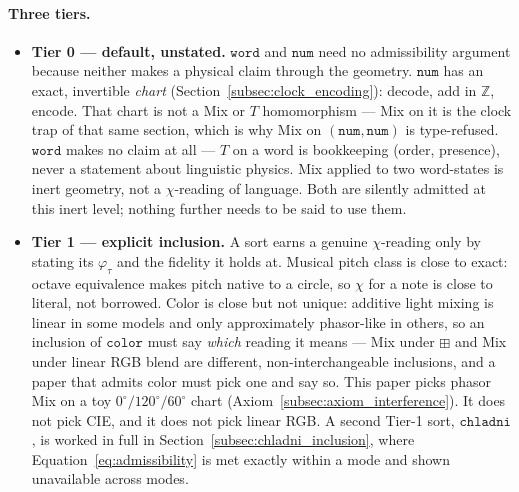 \documentclass[12pt, a4paper]{article}
\begin{document}
\paragraph{Three tiers.}
\begin{itemize}
    \item \textbf{Tier 0 --- default, unstated.} $\mathtt{word}$ and
    $\mathtt{num}$ need no admissibility argument because neither
    makes a physical claim through the geometry. $\mathtt{num}$
    has an exact, invertible \emph{chart}
    (Section~\ref{subsec:clock_encoding}): decode, add in
    $\mathbb{Z}$, encode. That chart is not a Mix or $T$
    homomorphism --- Mix on it is the clock trap of that same
    section, which is why Mix on $(\mathtt{num},\mathtt{num})$ is
    type-refused. $\mathtt{word}$ makes no claim at all --- $T$ on a
    word is bookkeeping (order, presence), never a statement about
    linguistic physics. Mix applied to two word-states is inert
    geometry, not a $\chi$-reading of language. Both are silently
    admitted at this inert level; nothing further needs to be said
    to use them.

    \item \textbf{Tier 1 --- explicit inclusion.} A sort earns a
    genuine $\chi$-reading only by stating its $\varphi_\tau$ and the
    fidelity it holds at. Musical pitch class is close to exact:
    octave equivalence makes pitch native to a circle, so $\chi$ for
    a note is close to literal, not borrowed. Color is close but not
    unique: additive light mixing is linear in some models and only
    approximately phasor-like in others, so an inclusion of
    $\mathtt{color}$ must say \emph{which} reading it means --- Mix
    under $\boxplus$ and Mix under linear RGB blend are different,
    non-interchangeable inclusions, and a paper that admits color
    must pick one and say so. This paper picks phasor Mix on a toy
    $0^\circ/120^\circ/60^\circ$ chart
    (Axiom~\ref{subsec:axiom_interference}). It does not pick CIE,
    and it does not pick linear RGB. A second Tier-1 sort,
    $\mathtt{chladni}$, is worked in full in
    Section~\ref{subsec:chladni_inclusion}, where
    Equation~\eqref{eq:admissibility} is met exactly within a mode
    and shown unavailable across modes.


\end{itemize}
\end{document}
